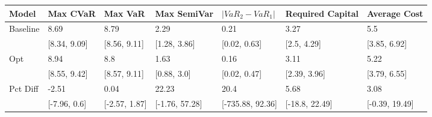 \begin{tabular}{lllllll}
\toprule
   Model &     Max CVaR &       Max VaR &    Max SemiVar & $|VaR_2 - VaR_1|$ & Required Capital &   Average Cost \\
\midrule
Baseline &         8.69 &          8.79 &           2.29 &              0.21 &             3.27 &            5.5 \\
         & [8.34, 9.09] &  [8.56, 9.11] &   [1.28, 3.86] &      [0.02, 0.63] &      [2.5, 4.29] &   [3.85, 6.92] \\
     Opt &         8.94 &           8.8 &           1.63 &              0.16 &             3.11 &           5.22 \\
         & [8.55, 9.42] &  [8.57, 9.11] &    [0.88, 3.0] &      [0.02, 0.47] &     [2.39, 3.96] &   [3.79, 6.55] \\
Pct Diff &        -2.51 &          0.04 &          22.23 &              20.4 &             5.68 &           3.08 \\
         & [-7.96, 0.6] & [-2.57, 1.87] & [-1.76, 57.28] &  [-735.88, 92.36] &   [-18.8, 22.49] & [-0.39, 19.49] \\
\bottomrule
\end{tabular}
